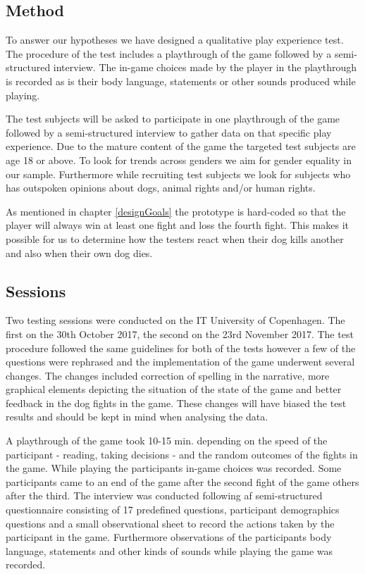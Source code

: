 \subsection{Method}
To answer our hypotheses we have designed a qualitative play experience test. The procedure of the test includes a playthrough of the game followed by a semi-structured interview. The in-game choices made by the player in the playthrough is recorded as is their body language, statements or other sounds produced while playing.

The test subjects will be asked to participate in one playthrough of the game followed by a semi-structured interview to gather data on that specific play experience. Due to the mature content of the game the targeted test subjects are age 18 or above. To look for trends across genders we aim for gender equality in our sample. Furthermore while recruiting test subjects we look for subjects who has outspoken opinions about dogs, animal rights and/or human rights.

As mentioned in chapter \ref{designGoals} the prototype is hard-coded so that the player will always win at least one fight and loss the fourth fight. This makes it possible for us to determine how the testers react when their dog kills another and also when their own dog dies.\

\subsection{Sessions} \label{sessions}
Two testing sessions were conducted on the IT University of Copenhagen. The first on the 30th October 2017, the second on the 23rd November 2017. The test procedure followed the same guidelines for both of the tests however a few of the questions were rephrased and the implementation of the game underwent several changes. The changes included correction of spelling in the narrative, more graphical elements depicting the situation of the state of the game and better feedback in the dog fights in the game. These changes will have biased the test results and should be kept in mind when analysing the data.

A playthrough of the game took 10-15 min. depending on the speed of the participant - reading, taking decisions - and the random outcomes of the fights in the game. While playing the participants in-game choices was recorded. Some participants came to an end of the game after the second fight of the game others after the third.
The interview was conducted following af semi-structured questionnaire consisting of 17 predefined questions, participant demographics questions and a small observational sheet to record the actions taken by the participant in the game. Furthermore observations of the participants body language, statements and other kinds of sounds while playing the game was recorded.

